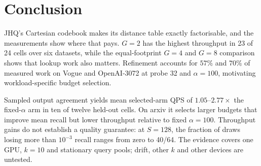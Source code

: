 \section{Conclusion}
\label{sec:conclu}
JHQ's Cartesian codebook makes its distance table exactly factorisable, and
the measurements show where that pays. $G{=}2$ has the highest throughput in
23 of 24 cells over six datasets, while the equal-footprint $G{=}4$ and
$G{=}8$ comparison shows that lookup work also matters. Refinement accounts
for $57\%$ and $70\%$ of measured work on Vogue and OpenAI-3072 at probe 32
and $\alpha=100$, motivating workload-specific budget selection.

Sampled output agreement yields mean selected-arm QPS of
$1.05$--$2.77\times$ the fixed-$\alpha$ arm in ten of twelve held-out cells.
On arxiv it selects larger budgets that improve mean recall but lower
throughput relative to fixed $\alpha=100$. Throughput gains do not establish a
quality guarantee: at $S=128$, the fraction of draws losing more than
$10^{-3}$ recall ranges from zero to 40/64. The evidence covers one GPU,
$k=10$ and stationary query pools; drift, other $k$ and other devices are
untested.
